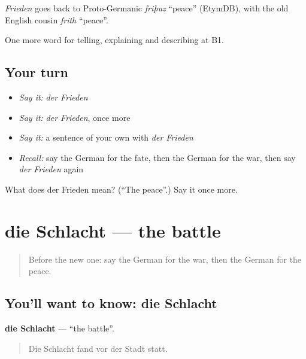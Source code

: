 \begin{cousinweb}
\emph{Frieden} goes back to Proto-Germanic \emph{friþuz} \textquotedblleft{}peace\textquotedblright{} (EtymDB), with the old English cousin \emph{frith} \textquotedblleft{}peace\textquotedblright{}.
\end{cousinweb}

\begin{grammarlens}[title={What you've built}]
One more word for telling, explaining and describing at B1.
\end{grammarlens}

\subsection*{Your turn}
\begin{itemize}
\raggedright
  \item \emph{Say it:} \emph{der Frieden}
  \item \emph{Say it:} \emph{der Frieden}, once more
  \item \emph{Say it:} a sentence of your own with \emph{der Frieden}
  \item \emph{Recall:} say the German for the fate, then the German for the war, then say \emph{der Frieden} again
\end{itemize}

\begin{tcolorbox}[breakable,colback=teal!4,colframe=teal!35!black,title={Before you move on}]
What does der Frieden mean? (\textquotedblleft{}The peace\textquotedblright{}.) Say it once more.
\end{tcolorbox}
\section[die Schlacht]{die Schlacht — the battle}

\label{lesson:GE-C318-schlacht}



\begin{quote}
Before the new one: say the German for the war, then the German for the peace.
\end{quote}

\subsection*{You'll want to know: die Schlacht}
\textbf{die Schlacht} — \textquotedblleft{}the battle\textquotedblright{}.

\begin{quote}
Die Schlacht fand vor der Stadt statt.
\end{quote}


